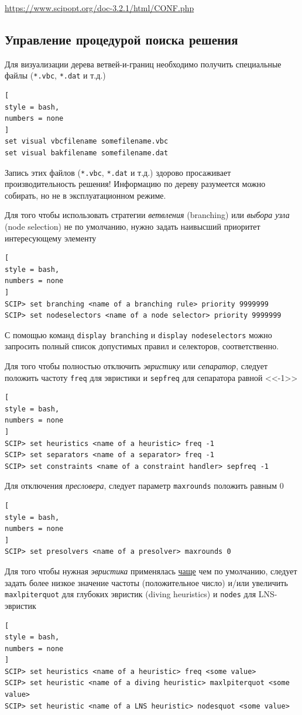 \documentclass[%
	11pt,
	a4paper,
	utf8,
		]{article}
\begin{document}
\url{https://www.scipopt.org/doc-3.2.1/html/CONF.php}

\subsection{Управление процедурой поиска решения}

Для визуализации дерева ветвей-и-границ необходимо получить специальные файлы (\verb*|*.vbc|, \verb|*.dat| и т.д.)
\begin{lstlisting}[
style = bash,
numbers = none
]
set visual vbcfilename somefilename.vbc
set visual bakfilename somefilename.dat
\end{lstlisting}

{\color{red} Запись этих файлов (\verb|*.vbc|, \verb|*.dat| и т.д.) здорово просаживает производительность решения! Информацию по дереву разумеется можно собирать, но не в эксплуатационном режиме.
}

Для того чтобы использовать стратегии \emph{ветвления} (branching) или \emph{выбора узла} (node selection) не по умолчанию, нужно задать наивысший приоритет интересующему элементу
\begin{lstlisting}[
style = bash,
numbers = none
]
SCIP> set branching <name of a branching rule> priority 9999999
SCIP> set nodeselectors <name of a node selector> priority 9999999
\end{lstlisting}

С помощью команд \verb|display branching| и \verb|display nodeselectors| можно запросить полный список допустимых правил и селекторов, соответственно.

Для того чтобы полностью отключить \emph{эвристику} или \emph{сепаратор}, следует положить частоту \verb|freq| для эвристики и \verb|sepfreq| для сепаратора равной <<-1>>
\begin{lstlisting}[
style = bash,
numbers = none
]
SCIP> set heuristics <name of a heuristic> freq -1
SCIP> set separators <name of a separator> freq -1
SCIP> set constraints <name of a constraint handler> sepfreq -1
\end{lstlisting}

Для отключения \emph{пресловера}, следует параметр \verb|maxrounds| положить равным 0
\begin{lstlisting}[
style = bash,
numbers = none
]
SCIP> set presolvers <name of a presolver> maxrounds 0
\end{lstlisting}

Для того чтобы нужная \emph{эвристика} применялась \underline{чаще} чем по умолчанию, следует задать более низкое значение частоты (положительное число) и/или увеличить \verb|maxlpiterquot| для глубоких эвристик (diving heuristics) и \verb|nodes| для LNS-эвристик
\begin{lstlisting}[
style = bash,
numbers = none
]
SCIP> set heuristics <name of a heuristic> freq <some value>
SCIP> set heuristic <name of a diving heuristic> maxlpiterquot <some value>
SCIP> set heuristic <name of a LNS heuristic> nodesquot <some value>
\end{lstlisting}
\end{document}
